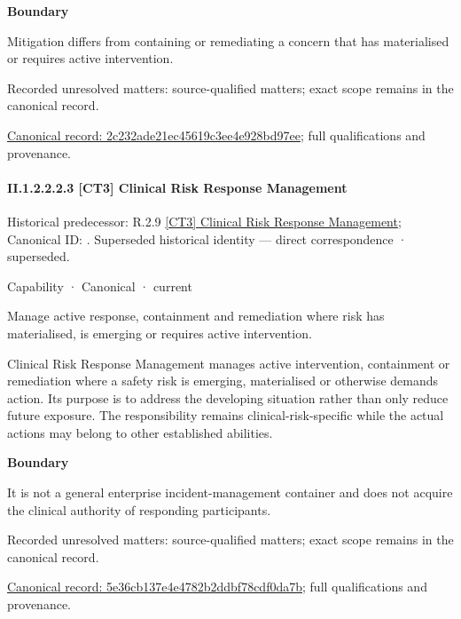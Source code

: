 \textbf{Boundary}



Mitigation differs from containing or remediating a concern that has materialised or requires active intervention.


{\small Recorded unresolved matters: source-qualified matters; exact scope remains in the canonical record.}\par
{\footnotesize \href{../../../../continuum/strategy/capability/2c232ade21ec45619c3ee4e928bd97ee.md}{Canonical record: 2c232ade21ec45619c3ee4e928bd97ee}; full qualifications and provenance.}\par
\paragraph*{II.1.2.2.2.3 [CT3] Clinical Risk Response Management}
\label{navigation:II.1.2.2.2.3}

{\small Historical predecessor: R.2.9 \hyperref[element:20f719ab4b6741b393ef570b4d1b05df]{[CT3] Clinical Risk Response Management}; Canonical ID: \texttt{}. Superseded historical identity — direct correspondence · superseded.}\par
\label{element:5e36cb137e4e4782b2ddbf78cdf0da7b}
{\small Capability · Canonical · current}\par

Manage active response, containment and remediation where risk has materialised, is emerging or requires active intervention.



Clinical Risk Response Management manages active intervention, containment or remediation where a safety risk is emerging, materialised or otherwise demands action. Its purpose is to address the developing situation rather than only reduce future exposure. The responsibility remains clinical-risk-specific while the actual actions may belong to other established abilities.



\textbf{Boundary}



It is not a general enterprise incident-management container and does not acquire the clinical authority of responding participants.


{\small Recorded unresolved matters: source-qualified matters; exact scope remains in the canonical record.}\par
{\footnotesize \href{../../../../continuum/strategy/capability/5e36cb137e4e4782b2ddbf78cdf0da7b.md}{Canonical record: 5e36cb137e4e4782b2ddbf78cdf0da7b}; full qualifications and provenance.}\par
